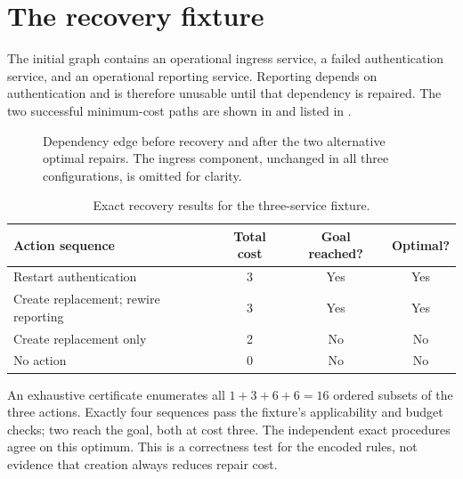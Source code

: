 \documentclass[11pt,a4paper]{article}
\begin{document}
\section{The recovery fixture}
The initial graph contains an operational ingress service, a failed authentication service, and an operational reporting service. Reporting depends on authentication and is therefore unusable until that dependency is repaired. The two successful minimum-cost paths are shown in  and listed in .
\begin{figure}[H]\centering
{}
\caption{Dependency edge before recovery and after the two alternative optimal repairs. The ingress component, unchanged in all three configurations, is omitted for clarity.}\label{fig:fixture}
\end{figure}

\begin{table}[H]\centering\caption{Exact recovery results for the three-service fixture.}\label{tab:fixture}
\begin{tabularx}{\linewidth}{@{}Xccc@{}}\toprule
Action sequence & Total cost & Goal reached? & Optimal?\\\midrule
Restart authentication & 3 & Yes & Yes\\
Create replacement; rewire reporting & 3 & Yes & Yes\\
Create replacement only & 2 & No & No\\
No action & 0 & No & No\\\bottomrule
\end{tabularx}
\end{table}

An exhaustive certificate enumerates all $1+3+6+6=16$ ordered subsets of the three actions. Exactly four sequences pass the fixture's applicability and budget checks; two reach the goal, both at cost three. The independent exact procedures agree on this optimum. This is a correctness test for the encoded rules, not evidence that creation always reduces repair cost.
\end{document}
